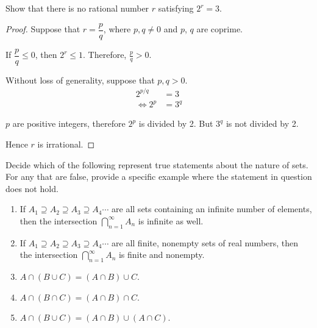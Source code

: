 \documentclass[class=understanding-analysis,crop=false]{standalone}
\begin{document}
\begin{exercise}
    \par Show that there is no rational number $r$ satisfying $2^{r} = 3$.
\end{exercise}

\begin{proof}
    \par Suppose that $r = \dfrac{p}{q}$, where $p, q\ne 0$ and $p$, $q$ are coprime.
    \par If $\dfrac{p}{q} \le 0$, then $2^{r} \le 1$. Therefore, $\frac{p}{q} > 0$.
    \par Without loss of generality, suppose that $p, q > 0$.
    \begin{align*}
        2^{p/q} & = 3 \\
        \Longleftrightarrow 2^{p} & = 3^{q}
    \end{align*}
    \par $p$ are positive integers, therefore $2^{p}$ is divided by 2. But $3^{q}$ is not divided by 2.
    \par Hence $r$ is irrational.
\end{proof}

\begin{exercise}
    \par Decide which of the following represent true statements about the nature of sets. For any that are false, provide a specific example where the statement in question does not hold.
    \begin{enumerate}[label = (\alph*)]
        \item If $A_{1}\supseteq A_{2}\supseteq A_{3}\supseteq A_{4} \cdots$ are all sets containing an infinite number of elements, then the intersection $\bigcap^{\infty}_{n=1}A_{n}$ is infinite as well.
        \item If $A_{1}\supseteq A_{2}\supseteq A_{3}\supseteq A_{4} \cdots$ are all finite, nonempty sets of real numbers, then the intersection $\bigcap^{\infty}_{n=1}A_{n}$ is finite and nonempty.
        \item $A\cap (B\cup C) = (A\cap B)\cup C$.
        \item $A\cap (B\cap C) = (A\cap B)\cap C$.
        \item $A\cap (B\cup C) = (A\cap B)\cup (A\cap C)$.
    \end{enumerate}
\end{exercise}
\end{document}
